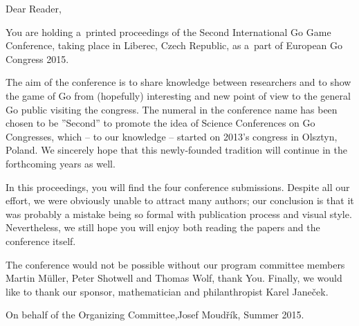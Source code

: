 \documentclass[a4paper,twocolumn,twoside,10pt]{book}
\begin{document}
Dear Reader,

You are holding a~printed proceedings of the Second International Go
Game Conference, taking place in Liberec, Czech Republic, as a~part of
European Go Congress 2015.

The aim of the conference is to share knowledge between researchers
and to show the game of Go from (hopefully) interesting and new point
of view to the general Go public visiting the congress.  The numeral in
the conference name has been chosen to be ''Second'' to promote the idea
of Science Conferences on Go Congresses, which -- to our knowledge --
started on 2013's congress in Olsztyn, Poland. We sincerely hope that this
newly-founded tradition will continue in the forthcoming years as well.

In this proceedings, you will find the four conference
submissions. Despite all our effort, we were obviously unable to attract
many authors; our conclusion is that it was probably a mistake being so
formal with publication process and visual style. Nevertheless, we still
hope you will enjoy both reading the papers and the conference itself.

The conference would not be possible without our program committee members
Martin Müller, Peter Shotwell and Thomas Wolf, thank You. Finally,
we would like to thank our sponsor, mathematician and philanthropist
Karel Janeček.

\vspace*{2ex}
\noindent On behalf of the Organizing Committee,\newline Josef Moudřík,
Summer 2015.

\tableofcontents

\mainmatter

\cleardoublepage
{}


\cleardoublepage
{}


\cleardoublepage
{}


\cleardoublepage
{}

\end{document}
